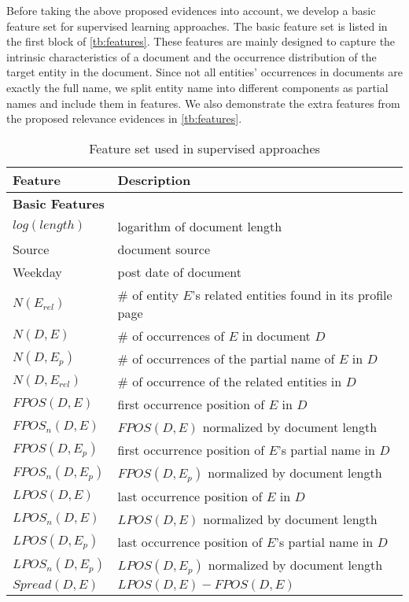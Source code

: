 \documentclass{sig-alternate}
\begin{document}
Before taking the above proposed evidences into account, we develop a basic feature set for supervised learning approaches. The basic feature set is listed in the first block of \autoref{tb:features}. These features are mainly designed to capture the intrinsic characteristics of a document and the occurrence distribution of the target entity in the document. Since not all entities' occurrences in documents are exactly the full name, we split entity name into different components as partial names and include them in features. We also demonstrate the extra features from the proposed relevance evidences in \autoref{tb:features}.
\begin{table}[thbp]
\centering
\caption{Feature set used in supervised approaches}\label{tb:features}
\begin{tabular}{lp{}} \hline
Feature&Description \\ \hline
\multicolumn{2}{l}{\textbf{Basic Features}} \\ \hline
$log(length)$ & logarithm of document length \\
Source & document source \\
Weekday & post date of document \\
$N(E_{rel})$ & \# of entity $E$'s related entities found in its profile page \\
$N(D, E)$ & \# of occurrences of $E$ in document $D$  \\
$N(D, E_{p})$ & \# of occurrences of the partial name of $E$ in $D$ \\
$N(D, E_{rel})$ & \# of occurrence of the related entities in $D$ \\
$FPOS(D, E)$ & first occurrence position of $E$ in $D$ \\
$FPOS_{n}(D, E)$ & $FPOS(D, E)$ normalized by document length \\
$FPOS(D, E_{p})$ &first occurrence  position of $E$'s partial name in $D$ \\
$FPOS_{n}(D, E_{p})$ & $FPOS(D, E_{p})$ normalized by document length \\
$LPOS(D, E)$ & last occurrence position of $E$ in $D$\\
$LPOS_{n}(D, E)$ & $LPOS(D, E)$ normalized by document length\\
$LPOS(D, E_{p})$ &  last occurrence position of $E$'s partial name  in $D$\\
$LPOS_{n}(D, E_{p})$ & $LPOS(D, E_{p})$ normalized by document length\\
$Spread(D, E)$ & $LPOS(D, E)-FPOS(D, E)$ \\

\end{tabular}
\end{table}
\end{document}
